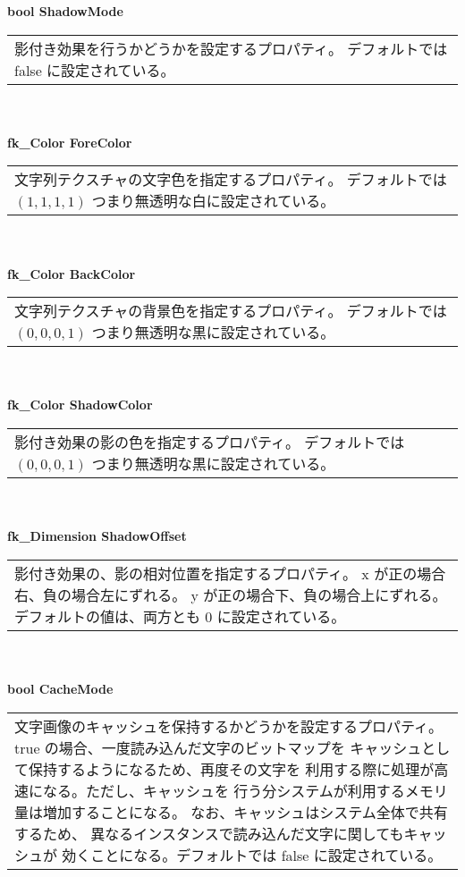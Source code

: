 \begin{tabbing}
\> \textbf{bool ShadowMode} \\
	\> \> \begin{tabular}{p{15cm}}
		影付き効果を行うかどうかを設定するプロパティ。
		デフォルトでは false に設定されている。
	\end{tabular} \\ \\

\> \textbf{fk\_Color ForeColor} \\
	\> \> \begin{tabular}{p{15cm}}
		文字列テクスチャの文字色を指定するプロパティ。
		デフォルトでは \((1, 1, 1, 1)\) つまり無透明な白に設定されている。
	\end{tabular} \\ \\

\> \textbf{fk\_Color BackColor} \\
	\> \> \begin{tabular}{p{15cm}}
		文字列テクスチャの背景色を指定するプロパティ。
		デフォルトでは \((0, 0, 0, 1)\) つまり無透明な黒に設定されている。
	\end{tabular} \\ \\

\> \textbf{fk\_Color ShadowColor} \\
	\> \> \begin{tabular}{p{15cm}}
		影付き効果の影の色を指定するプロパティ。
		デフォルトでは \((0, 0, 0, 1)\) つまり無透明な黒に設定されている。
	\end{tabular} \\ \\

\> \textbf{fk\_Dimension ShadowOffset} \\
	\> \> \begin{tabular}{p{15cm}}
		影付き効果の、影の相対位置を指定するプロパティ。
		x が正の場合右、負の場合左にずれる。
		y が正の場合下、負の場合上にずれる。
		デフォルトの値は、両方とも 0 に設定されている。
	\end{tabular} \\ \\

\> \textbf{bool CacheMode} \\
	\> \> \begin{tabular}{p{15cm}}
		文字画像のキャッシュを保持するかどうかを設定するプロパティ。
		true の場合、一度読み込んだ文字のビットマップを
		キャッシュとして保持するようになるため、再度その文字を
		利用する際に処理が高速になる。ただし、キャッシュを
		行う分システムが利用するメモリ量は増加することになる。
		なお、キャッシュはシステム全体で共有するため、
		異なるインスタンスで読み込んだ文字に関してもキャッシュが
		効くことになる。デフォルトでは false に設定されている。
	\end{tabular} \\ \\


\end{tabbing}
